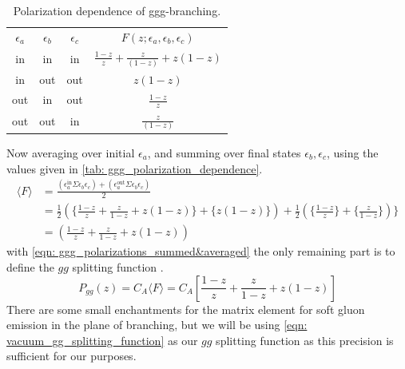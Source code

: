 \documentclass[main.tex]{subfiles}
\begin{document}
\begin{table}[htb]
    \centering
    \begin{tabular}[]{cccccc}
        \(\epsilon_a\) & \(\epsilon_b\) & \(\epsilon_c\)& \multicolumn{3}{c}{\(F(z;\epsilon_a,\epsilon_b,\epsilon_c)\)} \\
        \cmidrule(lr){1-3} \cmidrule(lr){4-6}
        in & in & in & \multicolumn{3}{c}{\(\frac{1-z}{z} + \frac{z}{(1-z)} + z(1-z)\)} \\[0.2cm]
        in & out & out & \multicolumn{3}{c}{\(z(1-z)\)} \\[0.2cm]
        out & in & out & \multicolumn{3}{c}{\(\frac{1-z}{z} \)} \\[0.2cm]
        out & out & in & \multicolumn{3}{c}{\(\frac{z}{(1-z)} \)} \\[0.2cm]
        \bottomrule
    \end{tabular}
    \caption{Polarization dependence of ggg-branching.}
    \label{tab: ggg_polarization_dependence}
\end{table}

Now averaging over initial \(\epsilon_a\), and summing over final states \(\epsilon_b, \epsilon_c\), using the values given in \autoref{tab: ggg_polarization_dependence}.
\begin{align}\label{eqn: ggg_polarizations_summed&averaged}
    \langle F \rangle &= \frac{(\epsilon_a^{\text{in}} \Sigma \epsilon_b\epsilon_c ) + (\epsilon_a^{\text{out}} \Sigma \epsilon_b\epsilon_c)}{2} \nonumber\\
    &= \frac{1}{2} \left( \{ \frac{1-z}{z} + \frac{z}{1-z} + z(1-z) \} + \{ z(1-z) \} \right) + \frac{1}{2} \left( \{\frac{1-z}{z} \} + \{ \frac{z}{1-z} \}\right) \} \nonumber\\
    &= \left( \frac{1-z}{z} + \frac{z}{1-z} + z(1-z) \right)
\end{align}
with \autoref{eqn: ggg_polarizations_summed&averaged} the only remaining part is to define the \(gg\) splitting function .
\begin{equation}\label{eqn: vacuum_gg_splitting_function}
    P_{gg}(z) = C_A \langle F \rangle = C_A \left[ \frac{1-z}{z} + \frac{z}{1-z} + z(1-z) \right]
\end{equation}
There are some small enchantments for the matrix element for soft gluon emission in the plane of branching, but we will be using \autoref{eqn: vacuum_gg_splitting_function} as our \(gg\) splitting function as this precision is sufficient for our purposes.
\end{document}

